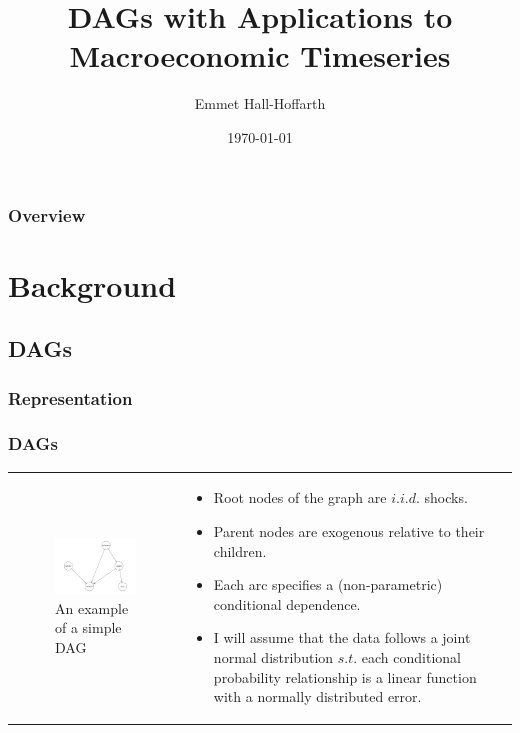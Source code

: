 \documentclass{beamer}
\title[Macro DAGs]{DAGs with Applications to Macroeconomic Timeseries} %
\author{Emmet Hall-Hoffarth} %
\institute[Oxford] %
{
University of Oxford \\ %
\medskip
\textit{emmet.hall-hoffarth@economics.ox.ac.uk} %
}
\date{\today} %
\begin{document}
\begin{frame}
    \titlepage %
\end{frame}

\begin{frame}
    \frametitle{Overview} %
    \tableofcontents %
\end{frame}

\section{Background}

\subsection{DAGs}
\subsubsection{Representation}
\begin{frame}
    \frametitle{DAGs}
    \begin{tabular}{ p{5.5cm} p{5.5cm} }
        \begin{figure}
            \includegraphics[width=4.5cm]{images/trafficjam.png}
            \caption{An example of a simple DAG}
            \label{dag1}
        \end{figure}
        &
        \begin{itemize}
            \item Root nodes of the graph are $i.i.d.$ shocks.
            \item Parent nodes are exogenous relative to their children.
            \item Each arc specifies a (non-parametric) conditional dependence.
            \item I will assume that the data follows a joint normal distribution $s.t.$ each conditional probability relationship is a linear function with a normally distributed error.
        \end{itemize}
    \end{tabular}
\end{frame}
\end{document}
